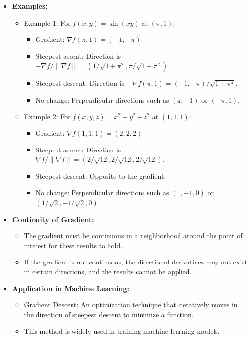 \documentclass{article}
\begin{document}
\begin{itemize}
  \item \textbf{Examples:}
    \begin{itemize}
      \item Example 1: For $f(x, y) = \sin(xy)$ at $(\pi, 1)$:
        \begin{itemize}
          \item Gradient: $\nabla f(\pi, 1) = (-1, -\pi)$.
          \item Steepest ascent: Direction is $-\nabla f/\|\nabla f\| = (1/\sqrt{1+\pi^2}, \pi/\sqrt{1+\pi^2})$.
          \item Steepest descent: Direction is $-\nabla f(\pi, 1) = (-1, -\pi)/\sqrt{1+\pi^2}$.
          \item No change: Perpendicular directions such as $(\pi, -1)$ or $(-\pi, 1)$.
        \end{itemize}
      \item Example 2: For $f(x, y, z) = x^2 + y^2 + z^2$ at $(1, 1, 1)$:
        \begin{itemize}
          \item Gradient: $\nabla f(1, 1, 1) = (2, 2, 2)$.
          \item Steepest ascent: Direction is $\nabla f/\|\nabla f\| = (2/\sqrt{12}, 2/\sqrt{12}, 2/\sqrt{12})$.
          \item Steepest descent: Opposite to the gradient.
          \item No change: Perpendicular directions such as $(1, -1, 0)$ or $(1/\sqrt{2}, -1/\sqrt{2}, 0)$.
        \end{itemize}
    \end{itemize}

  \item \textbf{Continuity of Gradient:}
    \begin{itemize}
      \item The gradient must be continuous in a neighborhood around the point of interest for these results to hold.
      \item If the gradient is not continuous, the directional derivatives may not exist in certain directions, and the results cannot be applied.
    \end{itemize}

  \item \textbf{Application in Machine Learning:}
    \begin{itemize}
      \item Gradient Descent: An optimization technique that iteratively moves in the direction of steepest descent to minimize a function.
      \item This method is widely used in training machine learning models.
    \end{itemize}
\end{itemize}
\end{document}
